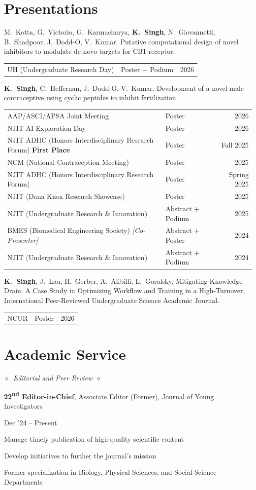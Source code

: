 \documentclass[10pt,a4paper]{article}
\makeatletter
\newlength{\entrygap}\setlength{\entrygap}{5pt}
\newcommand{\entry}[2]{%
  \par\vspace{\entrygap}%
  \noindent
  \begin{minipage}[t]{0.795\textwidth}\raggedright #1\end{minipage}%
  \hfill
  \begin{minipage}[t]{0.19\textwidth}\raggedleft\small #2\end{minipage}%
  \par\penalty500
}
\newcommand{\subhead}[1]{%
  \par\vspace{10pt}\noindent$\diamond$\ {\fontsize{11}{13}\selectfont\itshape #1}\ $\diamond$\par\vspace{3pt}}
\newcommand{\pres}[2][6]{\needspace{#1\baselineskip}%
  \par\vspace{6pt}\noindent\raggedright #2\par\vspace{1pt}}
\newcommand{\venues}[1]{%
  \begingroup
  \noindent\hspace*{1.3em}\small
  \begin{tabularx}{\dimexpr\textwidth-1.3em\relax}{@{}Xlr@{}}#1\end{tabularx}\par
  \endgroup}
\makeatother
\begin{document}
\section{Presentations}

\pres{M.~Kotta, G.~Victorio, G.~Karmacharya, \textbf{K.~Singh}, N.~Giovannetti, B.~Shadpoor, J.~Dodd-O, V.~Kumar. Putative computational design of novel inhibitors to modulate de-novo targets for CB1 receptor.}
\venues{
  UH (Undergraduate Research Day) & Poster + Podium & 2026 \\
}

\pres[16]{\textbf{K.~Singh}, C.~Heffernan, J.~Dodd-O, V.~Kumar. Development of a novel male contraceptive using cyclic peptides to inhibit fertilization.}
\venues{
  AAP/ASCI/APSA Joint Meeting & Poster & 2026 \\
  NJIT AI Exploration Day & Poster & 2026 \\
  NJIT ADHC (Honors Interdisciplinary Research Forum) \textbf{First Place} & Poster & Fall 2025 \\
  NCM (National Contraception Meeting) & Poster & 2025 \\
  NJIT ADHC (Honors Interdisciplinary Research Forum) & Poster & Spring 2025 \\
  NJIT (Dana Knox Research Showcase) & Poster & 2025 \\
  NJIT (Undergraduate Research \& Innovation) & Abstract + Podium & 2025 \\
  BMES (Biomedical Engineering Society) \textit{[Co-Presenter]} & Abstract + Poster & 2024 \\
  NJIT (Undergraduate Research \& Innovation) & Abstract + Podium & 2024 \\
}

\pres{\textbf{K.~Singh}, J.~Lau, H.~Gerber, A.~Alibilli, L.~Goralsky. Mitigating Knowledge Drain: A Case Study in Optimizing Workflow and Training in a High-Turnover, International Peer-Reviewed Undergraduate Science Academic Journal.}
\venues{
  NCUR & Poster & 2026 \\
}


\section{Academic Service}

\subhead{Editorial and Peer Review}
\entry{\textbf{22\textsuperscript{nd} Editor-in-Chief}, Associate Editor (Former), Journal of Young Investigators}{Dec '24 -- Present}
\begin{cvitems}
  \item Manage timely publication of high-quality scientific content
  \item Develop initiatives to further the journal's mission
  \item Former specialization in Biology, Physical Sciences, and Social Science Departments
\end{cvitems}
\end{document}
